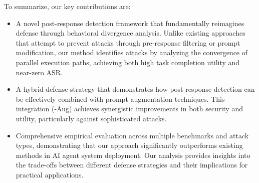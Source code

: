 To summarize, our key contributions are:
\begin{itemize}
    \item A novel post-response detection framework that fundamentally reimagines \ipi defense through behavioral divergence analysis. Unlike existing approaches that attempt to prevent attacks through pre-response filtering or prompt modification, our method identifies attacks by analyzing the convergence of parallel execution paths, achieving both high task completion utility and near-zero ASR.


    \item A hybrid defense strategy that demonstrates how post-response detection can be effectively combined with prompt augmentation techniques. This integration (\method-Aug) achieves synergistic improvements in both security and utility, particularly against sophisticated attacks.

    \item Comprehensive empirical evaluation across multiple benchmarks and attack types, demonstrating that our approach significantly outperforms existing methods in AI agent system deployment. Our analysis provides insights into the trade-offs between different defense strategies and their implications for practical applications.
\end{itemize}